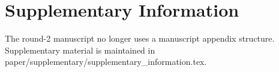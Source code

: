 \section*{Supplementary Information}

The round-2 manuscript no longer uses a manuscript appendix structure. Supplementary material is maintained in paper/supplementary/supplementary_information.tex.
